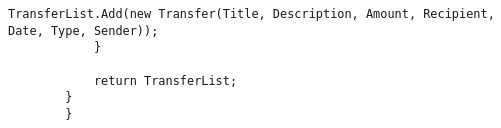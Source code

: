 \begin{lstlisting}[caption={Uddrag af filen "db.cs" fra kildekoden til programmet},label={lst:sqlite}]
                TransferList.Add(new Transfer(Title, Description, Amount, Recipient, Date, Type, Sender));
            }

            return TransferList;
        }
        }
\end{lstlisting}